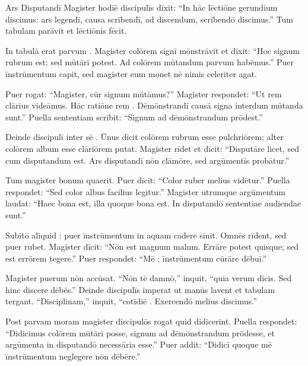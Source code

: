 \documentclass[12pt]{nextbook}
\begin{document}
\begin{readersection}{Ars Disputandī}
Magister hodiē discipulīs dīxit: “In hāc lēctiōne gerundium discimus: ars legendī, causa scrībendī, ad discendum, scrībendō discimus.” Tum tabulam parāvit et  lēctiōnis fēcit.

In tabulā erat parvum . Magister colōrem signī mōnstrāvit et dīxit: “Hoc signum rubrum est; sed  mūtārī potest. Ad colōrem mūtandum  parvum habēmus.” Puer īnstrūmentum capit, sed magister eum monet nē nimis celeriter agat.

Puer rogat: “Magister, cūr signum mūtāmus?” Magister respondet: “Ut rem clārius videāmus. Hāc ratiōne rem . Dēmōnstrandī causā signa interdum mūtanda sunt.” Puella sententiam scrībit: “Signum ad dēmōnstrandum prōdest.”

Deinde discipulī inter sē . Ūnus dīcit colōrem rubrum esse pulchriōrem; alter colōrem album esse clāriōrem putat. Magister rīdet et dīcit: “Disputāre licet, sed cum  disputandum est. Ars  disputandī nōn clāmōre, sed argūmentīs probātur.”

Tum magister  bonum quaerit. Puer dīcit: “Color ruber melius vidētur.” Puella respondet: “Sed color albus facilius legitur.” Magister utrumque argūmentum laudat: “Haec  bona est, illa quoque bona est. In disputandō sententiae audiendae sunt.”

Subitō aliquid : puer īnstrūmentum in aquam cadere sinit. Omnēs rīdent, sed puer rubet. Magister dīcit: “Nōn est magnum malum. Errāre potest quisque; sed  est errōrem tegere.” Puer respondet: “Mē ; īnstrūmentum cūrāre dēbuī.”

Magister puerum nōn accūsat. “Nōn tē damnō,” inquit, “quia verum dīcis. Sed hinc discere dēbēs.” Deinde discipulīs imperat ut manūs lavent et tabulam tergant. “Disciplinam,” inquit, “cotīdiē . Exercendō melius discimus.”

Post parvam moram magister discipulōs rogat quid didicerint. Puella respondet: “Didicimus colōrem mūtārī posse, signum ad dēmōnstrandum prōdesse, et argūmenta in disputandō necessāria esse.” Puer addit: “Didicī quoque mē īnstrūmentum neglegere nōn dēbēre.”


\end{readersection}
\end{document}

